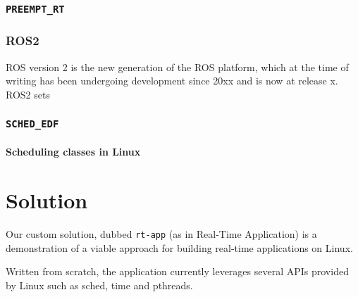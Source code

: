 \documentclass[a4paper,12pt]{report}
\begin{document}
\subsection{\texttt{PREEMPT\_RT}}





\subsection{ROS2}

ROS version 2 is the new generation of the ROS platform, which at the time of writing has been undergoing development since 20xx and is now at release x. ROS2 sets




\subsection{\texttt{SCHED\_EDF}}



\subsubsection{Scheduling classes in Linux}




\newpage
\chapter{Solution}

Our custom solution, dubbed \texttt{rt-app} (as in Real-Time
Application) is a demonstration of a viable approach for building
real-time applications on Linux. 

Written from scratch, the application currently leverages several APIs provided
by Linux such as sched, time and pthreads.
\end{document}
